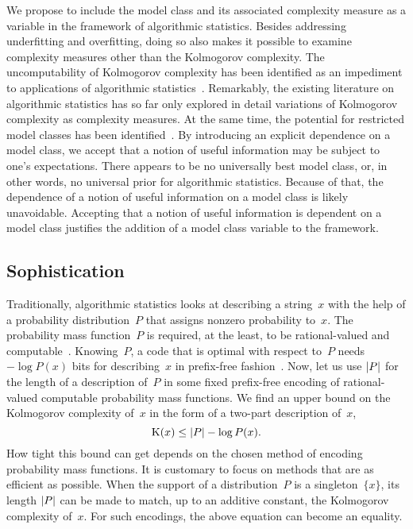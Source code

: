 We propose to include the model class and its associated complexity measure as a variable in the framework of algorithmic statistics.
Besides addressing underfitting and overfitting, doing so also makes it possible to examine complexity measures other than the Kolmogorov complexity.
The uncomputability of Kolmogorov complexity has been identified as an impediment to applications of algorithmic statistics~\parencite{rissanen1983universal,vereshchagin2017algorithmic}.
Remarkably, the existing literature on algorithmic statistics has so far only explored in detail variations of Kolmogorov complexity as complexity measures.
At the same time, the potential for restricted model classes has been identified~\parencite{bloem2014safe,vereshchagin2017algorithmic}.
By introducing an explicit dependence on a model class, we accept that a notion of useful information may be subject to one's expectations.
There appears to be no universally best model class, or, in other words, no universal prior for algorithmic statistics.
Because of that, the dependence of a notion of useful information on a model class is likely unavoidable.
\slogan[\label{slo:useful_information}]{Useful information is context-dependent.}
Accepting that a notion of useful information is dependent on a model class justifies the addition of a model class variable to the framework.

\subsection{Sophistication}
\label{sec:statistics:sophistication}%
Traditionally, algorithmic statistics looks at describing a string~$x$ with the help of a probability distribution~$P$ that assigns nonzero probability to~$x$.
The probability mass function~$P$ is required, at the least, to be rational-valued and computable~\parencite{vereshchagin2017algorithmic}.
Knowing~$P$, a code that is optimal with respect to~$P$ needs $-\log P(x)$ bits for describing~$x$ in prefix-free fashion~\parencite{cover2006elements}.
Now, let us use ${\lvert P\rvert}$ for the length of a description of~$P$ in some fixed prefix-free encoding of rational-valued computable probability mass functions.
We find an upper bound on the Kolmogorov complexity of~$x$ in the form of a two-part description of~$x$,
\begin{equation*}
  \operatorname{K}(x) \le {\lvert P\rvert} - \log P(x).
\end{equation*}
How tight this bound can get depends on the chosen method of encoding probability mass functions.
It is customary to focus on methods that are as efficient as possible.
When the support of a distribution~$P$ is a singleton~$\{x\}$, its length ${\lvert P\rvert}$ can be made to match, up to an additive constant, the Kolmogorov complexity of~$x$.
For such encodings, the above equation can become an equality.

